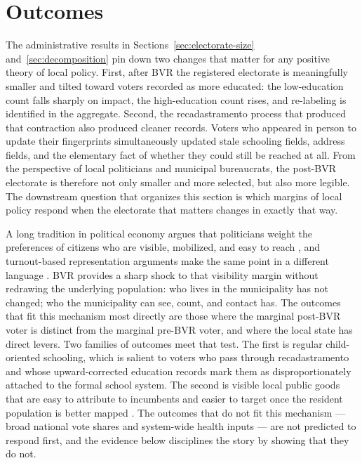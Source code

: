 \section{Outcomes}
\label{sec:downstream-outcomes}

The administrative results in Sections~\ref{sec:electorate-size} and~\ref{sec:decomposition} pin down two changes that matter for any positive theory of local policy. First, after BVR the registered electorate is meaningfully smaller and tilted toward voters recorded as more educated: the low-education count falls sharply on impact, the high-education count rises, and re-labeling is identified in the aggregate. Second, the recadastramento process that produced that contraction also produced cleaner records. Voters who appeared in person to update their fingerprints simultaneously updated stale schooling fields, address fields, and the elementary fact of whether they could still be reached at all. From the perspective of local politicians and municipal bureaucrats, the post-BVR electorate is therefore not only smaller and more selected, but also more legible. The downstream question that organizes this section is which margins of local policy respond when the electorate that matters changes in exactly that way.

A long tradition in political economy argues that politicians weight the preferences of citizens who are visible, mobilized, and easy to reach \citep{Lindbeck1987BalancedBudgetRedistri,Dixit1996TheDeterminSuccess,besleyCoate1997}, and turnout-based representation arguments make the same point in a different language \citep{Hajnal2005WhereTurnoutMatters}. BVR provides a sharp shock to that visibility margin without redrawing the underlying population: who lives in the municipality has not changed; who the municipality can see, count, and contact has. The outcomes that fit this mechanism most directly are those where the marginal post-BVR voter is distinct from the marginal pre-BVR voter, and where the local state has direct levers. Two families of outcomes meet that test. The first is regular child-oriented schooling, which is salient to voters who pass through recadastramento and whose upward-corrected education records mark them as disproportionately attached to the formal school system. The second is visible local public goods that are easy to attribute to incumbents and easier to target once the resident population is better mapped \citep{ferrazFinan2011}. The outcomes that do not fit this mechanism --- broad national vote shares and system-wide health inputs --- are not predicted to respond first, and the evidence below disciplines the story by showing that they do not.

